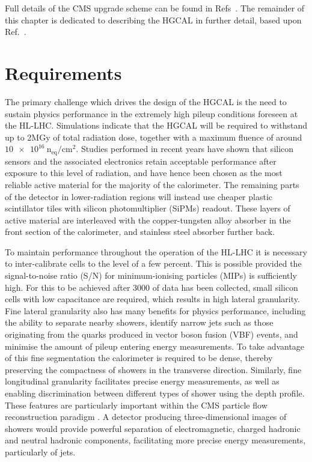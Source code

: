 Full details of the CMS upgrade scheme can be found in Refs~\cite{Tracker_Phase2TDR,Barrel_Phase2TDR,Muon_Phase2TDR,Trigger_Phase2TDR,DAQ_Phase2TDR,MTD,HGCAL}.
The remainder of this chapter is dedicated to describing the HGCAL in further detail, based upon Ref.~\cite{HGCAL}.

\section{Requirements}

The primary challenge which drives the design of the HGCAL is the need to sustain physics performance in the extremely high pileup conditions foreseen at the HL-LHC.
Simulations indicate that the HGCAL will be required to withstand up to 2MGy of total radiation dose, together with a maximum fluence of around $\SI{10e16}{\textrm{n}_{\textrm{eq}}/\textrm{cm}^2}.$
Studies performed in recent years have shown that silicon sensors and the associated electronics retain acceptable performance after exposure to this level of radiation, 
and have hence been chosen as the most reliable active material for the majority of the calorimeter.
The remaining parts of the detector in lower-radiation regions will instead use cheaper plastic scintillator tiles with silicon photomultiplier (SiPMs) readout.
These layers of active material are interleaved with the copper-tungsten alloy absorber in the front section of the calorimeter, 
and stainless steel absorber further back.

To maintain performance throughout the operation of the HL-LHC it is necessary to inter-calibrate cells to the level of a few percent.
This is possible provided the signal-to-noise ratio (S/N) for minimum-ionising particles (MIPs) is sufficiently high.
For this to be achieved after \SI{3000}{\fbinv} of data has been collected, small silicon cells with low capacitance are required, which results in high lateral granularity.
Fine lateral granularity also has many benefits for physics performance, including the ability to separate nearby showers, 
identify narrow jets such as those originating from the quarks produced in vector boson fusion (VBF) events, and minimise the amount of pileup entering energy measurements.
To take advantage of this fine segmentation the calorimeter is required to be dense, thereby preserving the compactness of showers in the transverse direction.
Similarly, fine longitudinal granularity facilitates precise energy measurements, as well as enabling discrimination between different types of shower using the depth profile.
These features are particularly important within the CMS particle flow reconstruction paradigm \cite{ParticleFlow}.
A detector producing three-dimensional images of showers would provide powerful separation of electromagnetic, charged hadronic and neutral hadronic components,
facilitating more precise energy measurements, particularly of jets.

